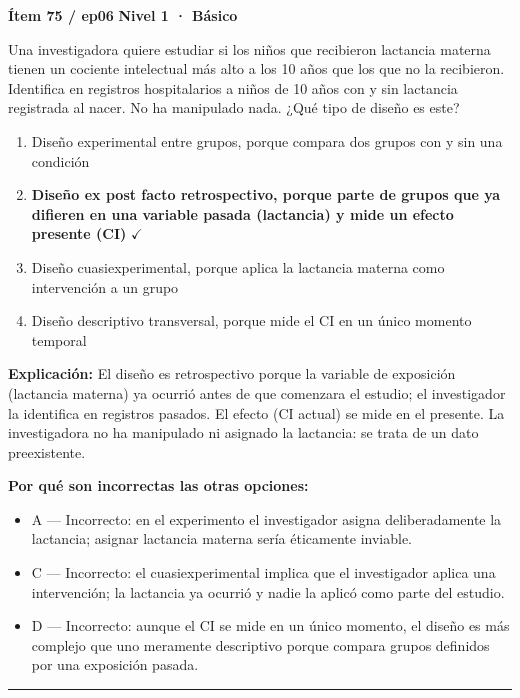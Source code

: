 \documentclass[12pt,a4paper]{article}
\begin{document}
\begin{mdframed}[backgroundcolor=fondogris,linecolor=azul,linewidth=1pt,innerleftmargin=10pt,innerrightmargin=10pt,innertopmargin=7pt,innerbottommargin=7pt]
\textbf{Ítem 75 / ep06} \hfill {\small\bfseries\color{azul} Nivel 1 · Básico}
\end{mdframed}

Una investigadora quiere estudiar si los niños que recibieron lactancia materna tienen un cociente intelectual más alto a los 10 años que los que no la recibieron. Identifica en registros hospitalarios a niños de 10 años con y sin lactancia registrada al nacer. No ha manipulado nada. ¿Qué tipo de diseño es este?

\begin{enumerate}
  \item[A.] Diseño experimental entre grupos, porque compara dos grupos con y sin una condición
  \item[\textbf{\color{verde}B.}] \textbf{\color{verde} Diseño ex post facto retrospectivo, porque parte de grupos que ya difieren en una variable pasada (lactancia) y mide un efecto presente (CI)} \hfill $\checkmark$
  \item[C.] Diseño cuasiexperimental, porque aplica la lactancia materna como intervención a un grupo
  \item[D.] Diseño descriptivo transversal, porque mide el CI en un único momento temporal
\end{enumerate}

\noindent\textbf{\color{azul}Explicación:} El diseño es retrospectivo porque la variable de exposición (lactancia materna) ya ocurrió antes de que comenzara el estudio; el investigador la identifica en registros pasados. El efecto (CI actual) se mide en el presente. La investigadora no ha manipulado ni asignado la lactancia: se trata de un dato preexistente.

\noindent\textbf{\color{gris}Por qué son incorrectas las otras opciones:}
\begin{itemize}
  \item {\small A — Incorrecto: en el experimento el investigador asigna deliberadamente la lactancia; asignar lactancia materna sería éticamente inviable.}
  \item {\small C — Incorrecto: el cuasiexperimental implica que el investigador aplica una intervención; la lactancia ya ocurrió y nadie la aplicó como parte del estudio.}
  \item {\small D — Incorrecto: aunque el CI se mide en un único momento, el diseño es más complejo que uno meramente descriptivo porque compara grupos definidos por una exposición pasada.}
\end{itemize}
\vspace{8pt}\hrule\vspace{10pt}
\end{document}
